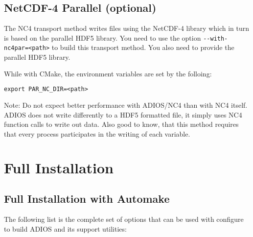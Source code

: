 \subsection{NetCDF-4 Parallel (optional)}

The NC4 transport method writes files using the NetCDF-4 library which in turn
is based on the parallel HDF5 library. You need to use the option
\verb+--with-nc4par=<path>+ to build this transport method.
You also need to provide the parallel HDF5 library.

While with CMake, the environment variables are set by the folloing:
\begin{lstlisting}
export PAR_NC_DIR=<path>
\end{lstlisting}

\noindent Note: Do not expect better performance with ADIOS/NC4 than with NC4 itself. ADIOS does not write differently to a HDF5 formatted file, it simply uses NC4 function calls to write out data. Also good to know, that this method requires that every process participates in the writing of each variable.

\section{Full Installation}

\subsection{Full Installation with Automake}

The following list is the complete set of options that can be used with
configure to build ADIOS and its support utilities:

